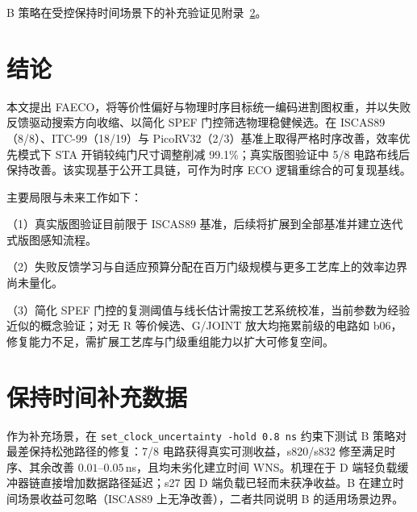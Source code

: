 \documentclass[twocolumn,10pt]{ctexart}
\begin{document}
B 策略在受控保持时间场景下的补充验证见附录~\ref{app:hold}。
\section{结论}\label{sec:conclusion}

本文提出 FAECO，将等价性偏好与物理时序目标统一编码进割图权重，并以失败反馈驱动搜索方向收缩、以简化 SPEF 门控筛选物理稳健候选。在 ISCAS89（8/8）、ITC-99（18/19）与 PicoRV32（2/3）基准上取得严格时序改善，效率优先模式下 STA 开销较纯门尺寸调整削减 99.1\%；真实版图验证中 5/8 电路布线后保持改善。该实现基于公开工具链，可作为时序 ECO 逻辑重综合的可复现基线。

主要局限与未来工作如下：

（1）真实版图验证目前限于 ISCAS89 基准，后续将扩展到全部基准并建立迭代式版图感知流程。

（2）失败反馈学习与自适应预算分配在百万门级规模与更多工艺库上的效率边界尚未量化。

（3）简化 SPEF 门控的复测阈值与线长估计需按工艺系统校准，当前参数为经验近似的概念验证；对无 R 等价候选、G/JOINT 放大均拖累前级的电路如 b06，修复能力不足，需扩展工艺库与门级重组能力以扩大可修复空间。




\appendix
\section{保持时间补充数据}\label{app:hold}

作为补充场景，在 \texttt{set\_clock\_uncertainty -hold 0.8\,ns} 约束下测试 B 策略对最差保持松弛路径的修复：7/8 电路获得真实可测收益，s820/s832 修至满足时序、其余改善 $0.01$--$0.05\,$ns，且均未劣化建立时间 WNS。机理在于 D 端轻负载缓冲器链直接增加数据路径延迟；s27 因 D 端负载已轻而未获净收益。B 在建立时间场景收益可忽略（ISCAS89 上无净改善），二者共同说明 B 的适用场景边界。
\end{document}
